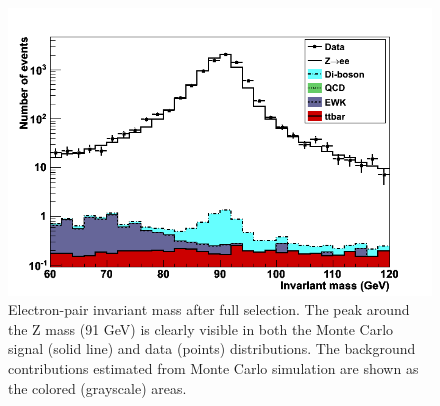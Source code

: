 


 \begin{figure}[htb]
  \begin{center}
    \includegraphics[width=360pt]{Figures/invMass-04Apr11-revised-04Jul11.png}
  \end{center}
  \caption[\fixspacing Electron-pair invariant mass after full selection]
  {\fixspacing Electron-pair invariant mass after full selection.
    The peak around the Z mass (91 GeV) is clearly visible
    in both the Monte Carlo signal (solid line) 
    and data (points) distributions.
    The background contributions estimated from Monte Carlo simulation
    are shown as the colored (grayscale) areas.
  }
  \label{fig:InvMass}
 \end{figure}


